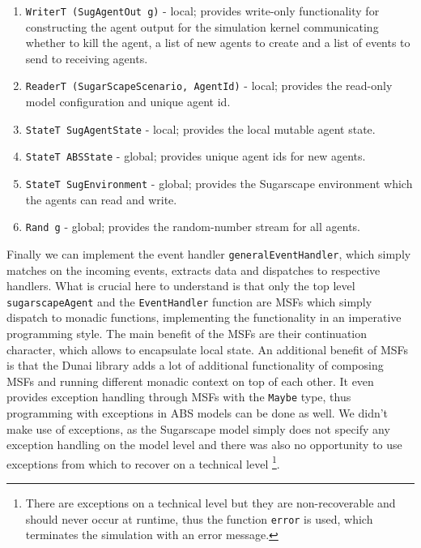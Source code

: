 \begin{enumerate}
	\item \texttt{WriterT (SugAgentOut g)} - local; provides write-only functionality for constructing the agent output for the simulation kernel communicating whether to kill the agent, a list of new agents to create and a list of events to send to receiving agents.
	
	\item \texttt{ReaderT (SugarScapeScenario, AgentId)} - local; provides the read-only model configuration and unique agent id.

	\item \texttt{StateT SugAgentState} - local; provides the local mutable agent state.

	\item \texttt{StateT ABSState} - global; provides unique agent ids for new agents. %

	\item \texttt{StateT SugEnvironment} - global; provides the Sugarscape environment which the agents can read and write.

	\item \texttt{Rand g} - global; provides the random-number stream for all agents.
\end{enumerate}

Finally we can implement the event handler \texttt{generalEventHandler}, which simply matches on the incoming events, extracts data and dispatches to respective handlers. What is crucial here to understand is that only the top level \texttt{sugarscapeAgent} and the \texttt{EventHandler} function are MSFs which simply dispatch to monadic functions, implementing the functionality in an imperative programming style. The main benefit of the MSFs are their continuation character, which allows to encapsulate local state. An additional benefit of MSFs is that the  Dunai library adds a lot of additional functionality of composing MSFs and running different monadic context on top of each other. It even provides exception handling through MSFs with the \texttt{Maybe} type, thus programming with exceptions in ABS models can be done as well. We didn't make use of exceptions, as the Sugarscape model simply does not specify any exception handling on the model level and there was also no opportunity to use exceptions from which to recover on a technical level \footnote{There are exceptions on a technical level but they are non-recoverable and should never occur at runtime, thus the function \texttt{error} is used, which terminates the simulation with an error message.}.

